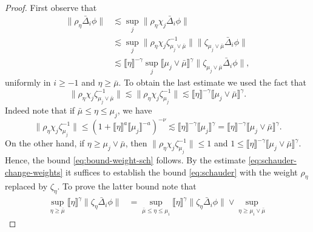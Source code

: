 \documentclass{article}
\numberwithin{equation}{section}
\theoremstyle{plain}
\theoremstyle{definition}
\begin{document}
\begin{proof}
  First observe that
  \begin{equation}
    \begin{aligned}
      \| \rho_{\eta}  \bar{\Delta}_i  \phi \|
      &\lesssim \sup_j \| \rho_{\eta} \chi_j  \bar{\Delta}_i  \phi \|\\
      &\lesssim \sup_j \| \rho_{\eta} \chi_j
      \zeta_{\mu_j \vee \bar{\mu}}^{- 1} \|
      \| \zeta_{\mu_j \vee \bar{\mu}} \bar{\Delta}_i  \phi \|\\
      &\lesssim \llbracket \eta \rrbracket^{- \gamma}
      \sup_j \llbracket \mu_j \vee \bar{\mu} \rrbracket^{\gamma}
      \| \zeta_{\mu_j \vee \bar{\mu}}  \bar{\Delta}_i  \phi \|,
    \end{aligned}
    \label{eq:schauder-change-weights}
  \end{equation}
  uniformly in $i \geqslant - 1$ and $\eta \geqslant \bar{\mu}$. To obtain the
  last estimate we used the fact that
  \begin{equation}
     \| \rho_{\eta} \chi_j \zeta_{\mu_j \vee \bar{\mu}}^{- 1} \|
    \lesssim \| \rho_{\eta} \chi_j \zeta_{\mu_j}^{- 1} \| \lesssim
    \llbracket \eta \rrbracket^{- \gamma} \llbracket \mu_j \vee \bar{\mu}
    \rrbracket^{\gamma} . \label{eq:bound-weight-sch}
  \end{equation}
  Indeed note that if $\bar{\mu} \leqslant \eta \leqslant \mu_j$, we have
  \[ \| \rho_{\eta} \chi_j \zeta_{\mu_j}^{- 1} \| \leqslant (1 + \llbracket
     \eta \rrbracket^a \llbracket \mu_j \rrbracket^{- a})^{- \nu} \lesssim
     \llbracket \eta \rrbracket^{- \gamma} \llbracket \mu_j
     \rrbracket^{\gamma} = \llbracket \eta \rrbracket^{- \gamma} \llbracket
     \mu_j \vee \bar{\mu} \rrbracket^{\gamma} . \]
  On the other hand, if $\eta \geqslant \mu_j \vee \bar{\mu}$, then $\|
  \rho_{\eta} \chi_j \zeta_{\mu_j}^{- 1} \| \leqslant 1$ and $1 \leqslant
  \llbracket \eta \rrbracket^{- \gamma} \llbracket \mu_j \vee \bar{\mu}
  \rrbracket^{\gamma}$. Hence, the bound \eqref{eq:bound-weight-sch} follows.
  By the estimate \eqref{eq:schauder-change-weights} it suffices to establish
  the bound \eqref{eq:schauder} with the weight $\rho_{\eta}$ replaced by
  $\zeta_{\eta}$. To prove the latter bound note that
  \begin{align*}
    \sup_{\eta \geqslant \bar{\mu}}  \llbracket \eta \rrbracket^{\gamma}  \|
    \zeta_{\eta} \bar{\Delta}_i  \phi \| &=  \sup_{\bar{\mu} \leqslant \eta
    \leqslant \mu_i}  \llbracket \eta \rrbracket^{\gamma}  \| \zeta_{\eta}
    \bar{\Delta}_i  \phi \| \vee \sup_{\eta \geqslant \mu_i \vee \bar{\mu}} 

\end{align*}
\end{proof}
\end{document}
